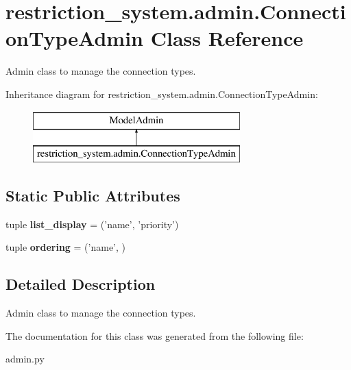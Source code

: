 \hypertarget{classrestriction__system_1_1admin_1_1ConnectionTypeAdmin}{}\section{restriction\+\_\+system.\+admin.\+Connection\+Type\+Admin Class Reference}
\label{classrestriction__system_1_1admin_1_1ConnectionTypeAdmin}


Admin class to manage the connection types.  


Inheritance diagram for restriction\+\_\+system.\+admin.\+Connection\+Type\+Admin\+:\begin{figure}[H]
\begin{center}
\leavevmode
\includegraphics[height=2.000000cm]{classrestriction__system_1_1admin_1_1ConnectionTypeAdmin}
\end{center}
\end{figure}
\subsection*{Static Public Attributes}
\begin{DoxyCompactItemize}
\item 
\hypertarget{classrestriction__system_1_1admin_1_1ConnectionTypeAdmin_a8850a60caa57fe719d5d1687098a8584}{}tuple {\bfseries list\+\_\+display} = ('name', 'priority')\label{classrestriction__system_1_1admin_1_1ConnectionTypeAdmin_a8850a60caa57fe719d5d1687098a8584}

\item 
\hypertarget{classrestriction__system_1_1admin_1_1ConnectionTypeAdmin_a97dfd7953f24278850c454fafbb28fea}{}tuple {\bfseries ordering} = ('name', )\label{classrestriction__system_1_1admin_1_1ConnectionTypeAdmin_a97dfd7953f24278850c454fafbb28fea}

\end{DoxyCompactItemize}


\subsection{Detailed Description}
Admin class to manage the connection types. 



The documentation for this class was generated from the following file\+:\begin{DoxyCompactItemize}
\item 
admin.\+py\end{DoxyCompactItemize}

